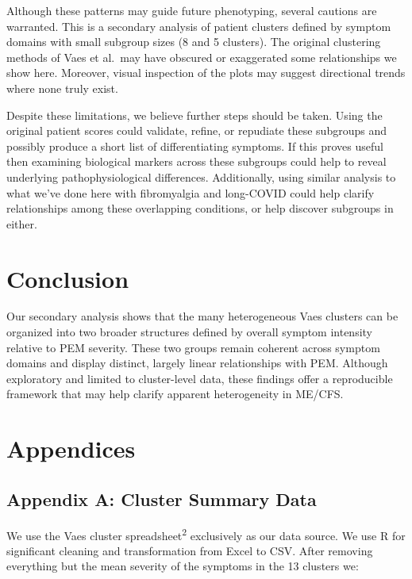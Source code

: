 \documentclass[
  letterpaper,
  DIV=11,
  numbers=noendperiod]{scrartcl}
\begin{document}
Although these patterns may guide future phenotyping, several cautions
are warranted. This is a secondary analysis of patient clusters defined
by symptom domains with small subgroup sizes (8 and 5 clusters). The
original clustering methods of Vaes et al.~may have obscured or
exaggerated some relationships we show here. Moreover, visual inspection
of the plots may suggest directional trends where none truly exist.

Despite these limitations, we believe further steps should be taken.
Using the original patient scores could validate, refine, or repudiate
these subgroups and possibly produce a short list of differentiating
symptoms. If this proves useful then examining biological markers across
these subgroups could help to reveal underlying pathophysiological
differences. Additionally, using similar analysis to what we've done
here with fibromyalgia and long-COVID could help clarify relationships
among these overlapping conditions, or help discover subgroups in
either.

\section{Conclusion}\label{conclusion}

Our secondary analysis shows that the many heterogeneous Vaes clusters
can be organized into two broader structures defined by overall symptom
intensity relative to PEM severity. These two groups remain coherent
across symptom domains and display distinct, largely linear
relationships with PEM. Although exploratory and limited to
cluster-level data, these findings offer a reproducible framework that
may help clarify apparent heterogeneity in ME/CFS.

\clearpage

\section{Appendices}\label{appendices}

\FloatBarrier

\subsection{Appendix A: Cluster Summary
Data}\label{appendix-a-cluster-summary-data}

We use the Vaes cluster spreadsheet\textsuperscript{2} exclusively as
our data source. We use R for significant cleaning and transformation
from Excel to CSV. After removing everything but the mean severity of
the symptoms in the 13 clusters we:
\end{document}
